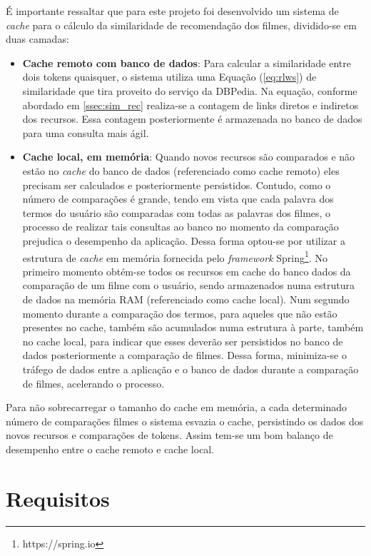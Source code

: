 É importante ressaltar que para este projeto foi desenvolvido um sistema de \textit{cache} para o cálculo da similaridade de recomendação dos filmes, dividido-se em duas camadas:

\begin{itemize}
	\item{\textbf{Cache remoto com banco de dados}: Para calcular a similaridade entre dois tokens quaisquer, o sistema utiliza uma Equação (\ref{eq:rlws}) de similaridade que tira proveito do serviço da DBPedia. Na equação, conforme abordado em \ref{ssec:sim_rec} realiza-se a contagem de links diretos e indiretos dos recursos. Essa contagem posteriormente é armazenada no banco de dados para uma consulta mais ágil.}
	\item{\textbf{Cache local, em memória}: Quando novos recursos são comparados e não estão no \textit{cache} do banco de dados (referenciado como cache remoto) eles precisam ser calculados e posteriormente persistidos. Contudo, como o número de comparações é grande, tendo em vista que cada palavra dos termos do usuário são comparadas com todas as palavras dos filmes, o processo de realizar tais consultas ao banco no momento da comparação prejudica o desempenho da aplicação. Dessa forma optou-se por utilizar a estrutura de \textit{cache} em memória fornecida pelo \textit{framework} Spring\footnote{https://spring.io}. No primeiro momento obtém-se todos os recursos em cache do banco dados da comparação de um filme com o usuário, sendo armazenados numa estrutura de dados na memória \ac{RAM} (referenciado como cache local). Num segundo momento durante a comparação dos termos, para aqueles que não estão presentes no cache, também são acumulados numa estrutura à parte, também no cache local, para indicar que esses deverão ser persistidos no banco de dados posteriormente a comparação de filmes. Dessa forma, minimiza-se o tráfego de dados entre a aplicação e o banco de dados durante a comparação de filmes, acelerando o processo.}
\end{itemize}
	
Para não sobrecarregar o tamanho do cache em memória, a cada determinado número de comparações filmes o sistema esvazia o cache, persistindo os dados dos novos recursos e comparações de tokens. Assim tem-se um bom balanço de desempenho entre o cache remoto e cache local.

\section{Requisitos}

